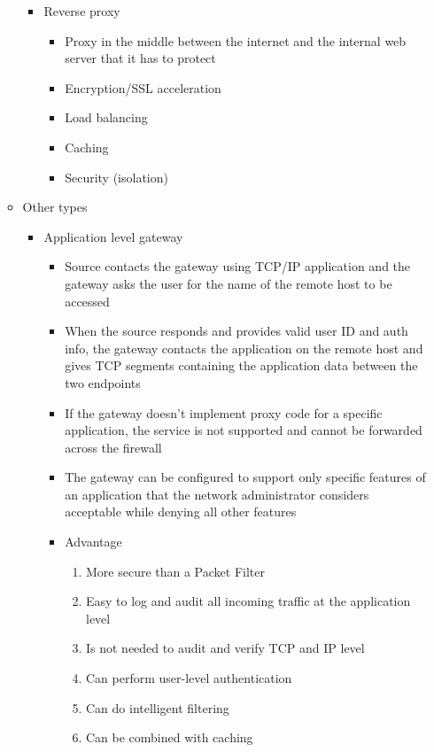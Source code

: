 \documentclass{article}
\begin{document}
\begin{itemize}
\begin{itemize}
\begin{itemize}
          \item Reverse proxy 
            \begin{itemize}
              \item Proxy in the middle between the internet and the internal web server that it has to protect
              \item Encryption/SSL acceleration
              \item Load balancing
              \item Caching
              \item Security (isolation)
            \end{itemize}
        \end{itemize}
      \item Other types
        \begin{itemize}
          \item Application level gateway
            \begin{itemize}
              \item Source contacts the gateway using TCP/IP application and the gateway asks the user for the name of the remote host to be accessed
              \item When the source responds and provides valid user ID and auth info, the gateway contacts the application on the remote host and gives TCP segments containing the application data between the two endpoints
              \item If the gateway doesn’t implement proxy code for a specific application, the service is not supported and cannot be forwarded across the firewall
              \item The gateway can be configured to support only specific features of an application that the network administrator considers acceptable while denying all other features
              \item Advantage
                \begin{enumerate}
                  \item More secure than a Packet Filter
                  \item Easy to log and audit all incoming traffic at the application level
                  \item Is not needed to audit and verify TCP and IP level
                  \item Can perform user-level authentication
                  \item Can do intelligent filtering
                  \item Can be combined with caching

\end{enumerate}
\end{itemize}
\end{itemize}
\end{itemize}
\end{itemize}
\end{document}
